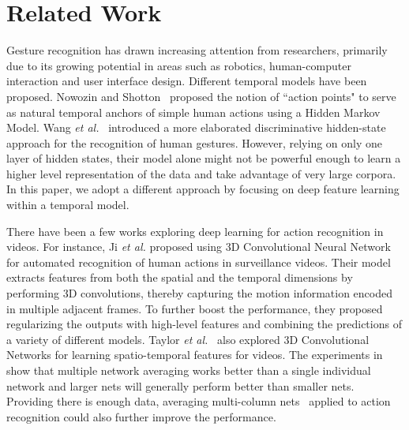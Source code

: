 
\section{Related Work}
\label{sec:relatedwork}

Gesture recognition has drawn increasing attention from researchers, primarily due to its growing potential in areas such as robotics, human-computer interaction and user interface design. Different temporal models have been proposed.
Nowozin and Shotton~\cite{nowozin2012action} proposed the notion of ``action points" to serve as natural temporal anchors of simple human actions using a Hidden Markov Model.
Wang \emph{et al.}~\cite{wang2006hidden} introduced a more elaborated discriminative hidden-state approach for the recognition of human gestures.
However, relying on only one layer of hidden states,
their model alone might not  be powerful enough to learn a higher level representation of the data and take advantage of very large corpora. In this paper, we adopt a different approach by focusing on deep feature learning within a temporal model.

There have been a few works exploring deep learning for action recognition in videos. For instance, Ji \emph{et al.}\cite{ji20133d} proposed using 3D Convolutional Neural Network for automated recognition of human actions in surveillance videos. Their model extracts features from both the spatial and the temporal dimensions by performing 3D convolutions, thereby capturing the motion information encoded in multiple adjacent frames. To further boost the performance, they proposed regularizing the outputs with high-level features and combining the predictions of a variety of different models. Taylor \emph{et al.}~\cite{taylor2010convolutional}  also explored 3D Convolutional Networks for learning spatio-temporal features for videos. The experiments in~\cite{wu2014deep} show that multiple network averaging works better than a single individual network and larger nets  will generally perform better than smaller nets.
Providing there is enough data, averaging multi-column nets~\cite{ciresan2012multi} applied to
action recognition could also further improve the performance.

